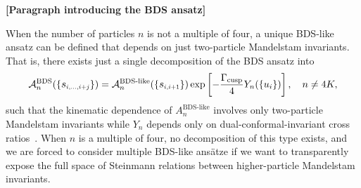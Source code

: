 \documentclass[11pt]{article}
\def\draftnote#1{{\bf [#1]}}
\def\mand#1{\scaleto{s}{4.6pt}_{\scaleto{#1}{5.2pt}}}
\begin{document}
\draftnote{Paragraph introducing the BDS ansatz}

When the number of particles $n$ is not a multiple of four, a unique BDS-like ansatz can be defined that depends on just two-particle Mandelstam invariants. That is, there exists just a single decomposition of the BDS ansatz into
\begin{equation}
{\cal A}_n^{\text{BDS}}(\{\mand{i,\dots,i+j}\}) = {\cal A}_n^{\text{BDS-like}}(\{\mand{i,i+1}\}) \exp \left[ - \frac{\Gamma_{\text{cusp}}}{4} Y_{n}(\{u_i\})  \right], \quad n\neq4K,
\end{equation}
such that the kinematic dependence of $A^{\text{BDS-like}}_{n}$ involves only two-particle Mandelstam invariants while $Y_{n}$ depends only on dual-conformal-invariant cross ratios~\cite{Yang:2010az}. %
When $n$ is a multiple of four, no decomposition of this type exists, and we are forced to consider multiple BDS-like ans\"atze if we want to transparently expose the full space of Steinmann relations between higher-particle Mandelstam invariants. 
\end{document}
